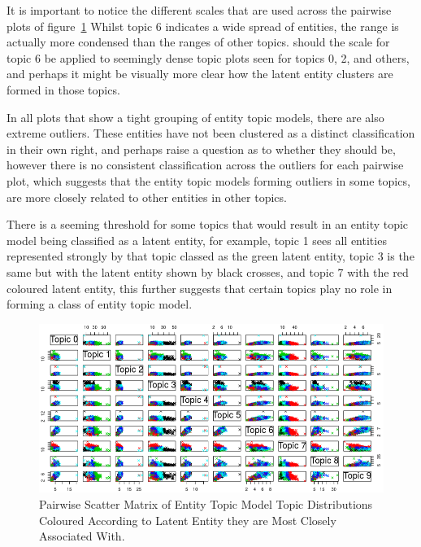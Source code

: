 \documentclass[10pt]{report}
\begin{document}
It is important to notice the different scales that are used across the pairwise plots of figure~\ref{fig:hp_le_clusters} Whilst topic 6 indicates a wide spread of entities, the range is actually more condensed than the ranges of other topics. should the scale for topic 6 be applied to seemingly dense topic plots seen for topics 0, 2, and others, and perhaps it might be visually more clear how the latent entity clusters are formed in those topics.

In all plots that show a tight grouping of entity topic models, there are also extreme outliers. These entities have not been clustered as a distinct classification in their own right, and perhaps raise a question as to whether they should be, however there is no consistent classification across the outliers for each pairwise plot, which suggests that the entity topic models forming outliers in some topics, are more closely related to other entities in other topics.

There is a seeming threshold for some topics that would result in an entity topic model being classified as a latent entity, for example, topic 1 sees all entities represented strongly by that topic classed as the green latent entity, topic 3 is the same but with the latent entity shown by black crosses, and topic 7 with the red coloured latent entity, this further suggests that certain topics play no role in forming a class of entity topic model.

\clearpage
\renewcommand{\baselinestretch}{1.0}\normalsize
\renewcommand{\arraystretch}{1.0}
\begin{figure}[h!]
  \centering
  \includegraphics[angle=-90, scale=0.8]{hp_full_le_clusters}
\caption{ Pairwise Scatter Matrix of Entity Topic Model Topic Distributions Coloured According to Latent Entity they are Most Closely Associated With.\label{fig:hp_le_clusters}}
\end{figure}
\renewcommand{\baselinestretch}{2.0}\normalsize
\renewcommand{\arraystretch}{1.0}
\end{document}
